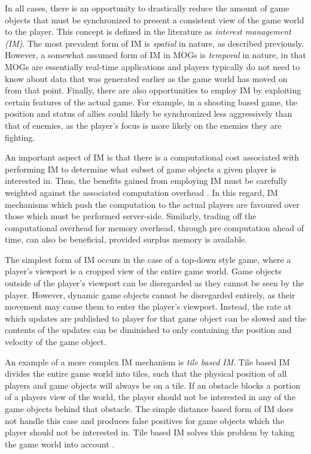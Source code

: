 In all cases, there is an opportunity to drastically reduce the amount of game objects that must be synchronized to present a consistent view of the game world to the player. This concept is defined in the literature as \textit{interest management (IM)}. The most prevalent form of IM is \textit{spatial} in nature, as described previously. However, a somewhat assumed form of IM in MOGs is \textit{temporal} in nature, in that MOGs are essentially real-time applications and players typically do not need to know about data that was generated earlier as the game world has moved on from that point. Finally, there are also opportunities to employ IM by exploiting certain features of the actual game. For example, in a shooting based game, the position and status of allies could likely be synchronized less aggressively than that of enemies, as the player's focus is more likely on the enemies they are fighting.

An important aspect of IM is that there is a computational cost associated with performing IM to determine what subset of game objects a given player is interested in. Thus, the benefits gained from employing IM must be carefully weighted against the associated computation overhead \cite{im-thesis}. In this regard, IM mechanisms which push the computation to the actual players are favoured over those which must be performed server-side. Similarly, trading off the computational overhead for memory overhead, through pre computation ahead of time, can also be beneficial, provided surplus memory is available.

The simplest form of IM occurs in the case of a top-down style game, where a player's viewport is a cropped view of the entire game world. Game objects outside of the player's viewport can be disregarded as they cannot be seen by the player. However, dynamic game objects  cannot be disregarded entirely, as their movement may cause them to enter the player's viewport. Instead, the rate at which updates are published to player for that game object can be slowed and the contents of the updates can be diminished to only containing the position and velocity of the game object.

An example of a more complex IM mechanism is \textit{tile based IM}. Tile based IM divides the entire game world into tiles, such that the physical position of all players and game objects will always be on a tile. If an obstacle blocks a portion of a players view of the world, the player should not be interested in any of the game objects behind that obstacle.  The simple distance based form of IM does not handle this case and produces false positives for game objects which the player should not be interested in. Tile based IM solves this problem by taking the game world into account \cite{pub-sub-mog}.

